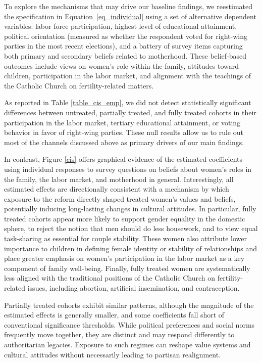 \documentclass[a4paper,oneside,final,onecolumn,12pt,english]{article}
\begin{document}
To explore the mechanisms that may drive our baseline findings, we reestimated the specification in Equation~\ref{eq_individual} using a set of alternative dependent variables: labor force participation, highest level of educational attainment, political orientation (measured as whether the respondent voted for right-wing parties in the most recent elections), and a battery of survey items capturing both primary and secondary beliefs related to motherhood. These belief-based outcomes include views on women’s role within the family, attitudes toward children, participation in the labor market, and alignment with the teachings of the Catholic Church on fertility-related matters.



As reported in Table \ref{table_cis_emp}, we did not detect statistically significant differences between untreated, partially treated, and fully treated cohorts in their participation in the labor market, tertiary educational attainment, or voting behavior in favor of right-wing parties. These null results allow us to rule out most of the channels discussed above as primary drivers of our main findings. 

In contrast, Figure \ref{cis} offers graphical evidence of the estimated coefficients using individual responses to survey questions on beliefs about women's roles in the family, the labor market, and motherhood in general. Interestingly, all estimated effects are directionally consistent with a mechanism by which exposure to the reform directly shaped treated women’s values and beliefs, potentially inducing long-lasting changes in cultural attitudes. In particular, fully treated cohorts appear more likely to support gender equality in the domestic sphere, to reject the notion that men should do less housework, and to view equal task-sharing as essential for couple stability. These women also attribute lower importance to children in defining female identity or stability of relationships and place greater emphasis on women’s participation in the labor market as a key component of family well-being. Finally, fully treated women are systematically less aligned with the traditional positions of the Catholic Church on fertility-related issues, including abortion, artificial insemination, and contraception. 

Partially treated cohorts exhibit similar patterns, although the magnitude of the estimated effects is generally smaller, and some coefficients fall short of conventional significance thresholds. While political preferences and social norms frequently move together, they are distinct and may respond differently to authoritarian legacies. Exposure to such regimes can reshape value systems and cultural attitudes without necessarily leading to partisan realignment. 
\end{document}
